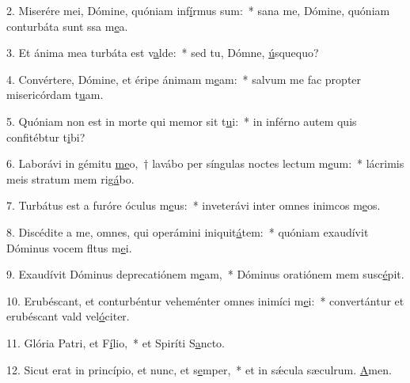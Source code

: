 2. Miserére mei, Dómine, quóniam inf\uline{í}rmus sum:~* sana me, Dómine, quóniam conturbáta sunt ssa m\uline{e}a.\par 
3. Et ánima mea turbáta est v\uline{a}lde:~* sed tu, Dómne, \uline{ú}squequo?\par 
4. Convértere, Dómine, et éripe ánimam m\uline{e}am:~* salvum me fac propter misericórdam t\uline{u}am.\par 
5. Quóniam non est in morte qui memor sit t\uline{u}i:~* in inférno autem quis confitébtur t\uline{i}bi?\par 
6. Laborávi in gémitu \uline{me}o,~† lavábo per síngulas noctes lectum m\uline{e}um:~* lácrimis meis stratum mem rig\uline{á}bo.\par 
7. Turbátus est a furóre óculus m\uline{e}us:~* inveterávi inter omnes inimcos m\uline{e}os.\par 
8. Discédite a me, omnes, qui operámini iniquit\uline{á}tem:~* quóniam exaudívit Dóminus vocem fltus m\uline{e}i.\par 
9. Exaudívit Dóminus deprecatiónem m\uline{e}am,~* Dóminus oratiónem mem susc\uline{é}pit.\par 
10. Erubéscant, et conturbéntur veheménter omnes inimíci m\uline{e}i:~* convertántur et erubéscant vald vel\uline{ó}citer.\par 
11. Glória Patri, et F\uline{í}lio,~* et Spiríti S\uline{a}ncto.\par 
12. Sicut erat in princípio, et nunc, et s\uline{e}mper,~* et in sǽcula sæculrum. \uline{A}men.\par 

